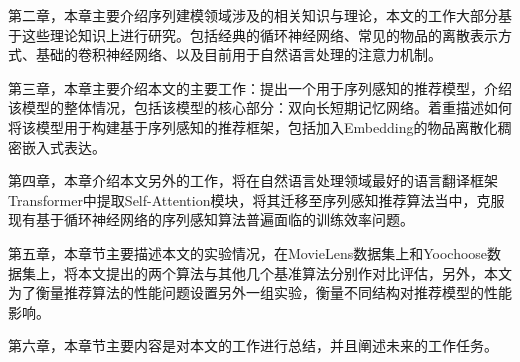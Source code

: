 第二章，本章主要介绍序列建模领域涉及的相关知识与理论，本文的工作大部分基于这些理论知识上进行研究。包括经典的循环神经网络、常见的物品的离散表示方式、基础的卷积神经网络、以及目前用于自然语言处理的注意力机制。

第三章，本章主要介绍本文的主要工作：提出一个用于序列感知的推荐模型，介绍该模型的整体情况，包括该模型的核心部分：双向长短期记忆网络。着重描述如何将该模型用于构建基于序列感知的推荐框架，包括加入Embedding的物品离散化稠密嵌入式表达。


第四章，本章介绍本文另外的工作，将在自然语言处理领域最好的语言翻译框架Transformer中提取Self-Attention模块，将其迁移至序列感知推荐算法当中，克服现有基于循环神经网络的序列感知算法普遍面临的训练效率问题。

第五章，本章节主要描述本文的实验情况，在MovieLens数据集上和Yoochoose数据集上，将本文提出的两个算法与其他几个基准算法分别作对比评估，另外，本文为了衡量推荐算法的性能问题设置另外一组实验，衡量不同结构对推荐模型的性能影响。

第六章，本章节主要内容是对本文的工作进行总结，并且阐述未来的工作任务。
